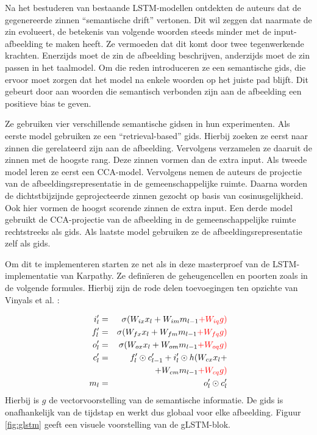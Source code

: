 Na het bestuderen van bestaande LSTM-modellen ontdekten de auteurs dat de gegenereerde zinnen ``semantische drift'' vertonen. Dit wil zeggen dat naarmate de zin evolueert, de betekenis van volgende woorden steeds minder met de input-afbeelding te maken heeft. Ze vermoeden dat dit komt door twee tegenwerkende krachten. Enerzijds moet de zin de afbeelding beschrijven, anderzijds moet de zin passen in het taalmodel. Om die reden introduceren ze een semantische gids, die ervoor moet zorgen dat het model na enkele woorden op het juiste pad blijft. Dit gebeurt door aan woorden die semantisch verbonden zijn aan de afbeelding een positieve bias te geven.

Ze gebruiken vier verschillende semantische gidsen in hun experimenten. Als eerste model gebruiken ze een ``retrieval-based'' gids. Hierbij zoeken ze eerst naar zinnen die gerelateerd zijn aan de afbeelding. Vervolgens verzamelen ze daaruit de zinnen met de hoogste rang. Deze zinnen vormen dan de extra input.
Als tweede model leren ze eerst een CCA-model. Vervolgens nemen de auteurs de projectie van de afbeeldingsrepresentatie in de gemeenschappelijke ruimte. Daarna worden de dichtstbijzijnde geprojecteerde zinnen gezocht op basis van cosinusgelijkheid. Ook hier vormen de hoogst scorende zinnen de extra input.
Een derde model gebruikt de CCA-projectie van de afbeelding in de gemeenschappelijke ruimte rechtstreeks als gids.
Als laatste model gebruiken ze de afbeeldingsrepresentatie zelf als gids.

Om dit te implementeren starten ze net als in deze masterproef van de LSTM-implementatie van Karpathy. Ze defin\"ieren de geheugencellen en poorten zoals in de volgende formules. Hierbij zijn de rode delen toevoegingen ten opzichte van Vinyals et al.\cite{Google} :

%
\begin{eqnarray}
\vspace{-3mm}
\label{glstm-memory-start}
i_l' & = & \sigma (W_{ix} x_l + W_{im} m_{l-1} \color{red}{+ W_{iq} g}) \label{glstm-input} \\
f_l' & = & \sigma (W_{fx} x_l + W_{fm} m_{l-1} \color{red}{+ W_{fq} g}) \\
o_l' & = & \sigma (W_{ox} x_l + W_{om} m_{l-1} \color{red}{+ W_{oq} g}) \\
c_l' & = & f_l' \odot c_{l-1}' + i_l' \odot h(W_{cx} x_l + \nonumber \\
&   & + W_{cm} m_{l-1} \color{red}{+ W_{cq} g}) \\
m_l & = & o_l' \odot c_l'
\label{glstm-memory}
\vspace{-3mm}
\end{eqnarray}
Hierbij is $g$ de vectorvoorstelling van de semantische informatie. De gids is onafhankelijk van de tijdstap en werkt dus globaal voor elke afbeelding. Figuur \ref{fig:glstm} geeft een visuele voorstelling van de gLSTM-blok.

